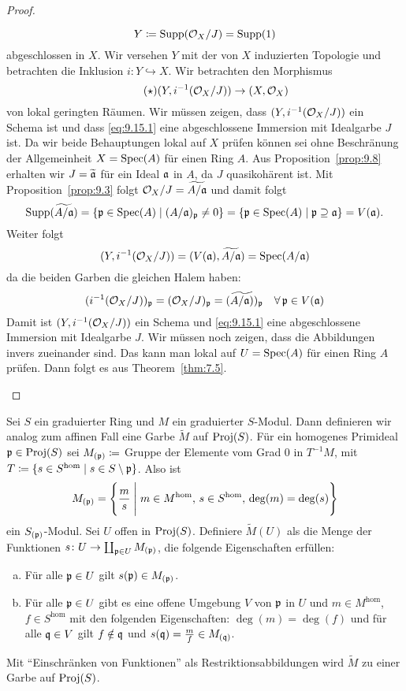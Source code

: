 \begin{prop}
\begin{proof}
\begin{enumerate}[i)]
 			\[
 				Y \coloneqq \operatorname{Supp}(\mathcal{O}_X/J) = \operatorname{Supp}(1)
 			\]
 			abgeschlossen in $X$. Wir versehen $Y$ mit der von $X$ induzierten Topologie und betrachten die Inklusion $i\colon Y \hookrightarrow X$. Wir betrachten den Morphismus
 			\[
 			\label{eq:9.15.1}\tag{$\star$}
 				(Y,i^{-1}(\mathcal{O}_X/J)) \to (X,\mathcal{O}_X)
 			\]
 			von lokal geringten Räumen. Wir müssen zeigen, dass $(Y,i^{-1}(\mathcal{O}_X/J))$ ein Schema ist und dass \eqref{eq:9.15.1} eine abgeschlossene Immersion mit Idealgarbe $J$ ist. Da wir beide Behauptungen lokal auf $X$ prüfen können sei ohne Beschränung der Allgemeinheit $X = \operatorname{Spec}(A)$ für einen Ring $A$. Aus Proposition~\ref{prop:9.8} erhalten wir $J = \widetilde{\mathfrak{a}}$ für ein Ideal $\mathfrak{a}$ in $A$, da $J$ quasikohärent ist. Mit Proposition~\ref{prop:9.3} folgt $\mathcal{O}_X/J = \widetilde{A/\mathfrak{a}}$ und damit folgt
 			\[
 				\operatorname{Supp}(\widetilde{A/\mathfrak{a}}) = \{\mathfrak{p} \in \operatorname{Spec}(A) \mid (A/\mathfrak{a})_{\mathfrak{p}} \neq 0\} = \{\mathfrak{p} \in \operatorname{Spec}(A) \mid \mathfrak{p} \supseteq \mathfrak{a}\} = V(\mathfrak{a}).
 			\]
 			Weiter folgt
 			\[
 				(Y,i^{-1}(\mathcal{O}_X/J)) = (V(\mathfrak{a}),\widetilde{A/\mathfrak{a}}) = \operatorname{Spec}(A/\mathfrak{a})
 			\]
 			da die beiden Garben die gleichen Halem haben:
 			\[
 				(i^{-1}(\mathcal{O}_X/J))_{\mathfrak{p}} = (\mathcal{O}_X/J)_{\mathfrak{p}} = (\widetilde{A/\mathfrak{a})})_{\mathfrak{p}}\quad \forall\, \mathfrak{p} \in V(\mathfrak{a})
 			\]
 			Damit ist $(Y,i^{-1}(\mathcal{O}_X/J))$ ein Schema und \eqref{eq:9.15.1} eine abgeschlossene Immersion mit Idealgarbe $J$. Wir müssen noch zeigen, dass die Abbildungen invers zueinander sind. Das kann man lokal auf $U=\operatorname{Spec}(A)$ für einen Ring $A$ prüfen. Dann folgt es aus Theorem~\ref{thm:7.5}.
 		\end{enumerate}
 	\end{proof}
\end{prop}

\begin{defn}
\label{defn:9.16}
	Sei $S$ ein graduierter Ring und $M$ ein graduierter $S$-Modul. Dann definieren wir analog zum affinen Fall eine Garbe $\widetilde{M}$ auf $\operatorname{Proj}(S)$. Für ein homogenes Primideal $\mathfrak{p} \in \operatorname{Proj}(S)$ sei $M_{(\mathfrak{p})}\coloneqq$ Gruppe der Elemente vom Grad $0$ in $T^{-1}M$, mit $T\coloneqq \{s \in S^\text{hom}\mid s \in S \setminus \mathfrak{p}\}$. Also ist
	\[
		M_{(\mathfrak{p})} = \Bigg\lbrace \frac{m}{s} \;\Bigg\vert\; m \in M^{\text{hom}},\, s \in S^{\text{hom}},\, \deg(m) = \deg(s) \Bigg\rbrace
	\]
	ein $S_{(\mathfrak{p})}$-Modul. Sei $U$ offen in $\operatorname{Proj}(S)$. Definiere $\widetilde{M}(U)$ als die Menge der Funktionen $s\colon U \to \coprod_{\mathfrak{p} \in U}M_{(\mathfrak{p})}$, die folgende Eigenschaften erfüllen:
	\begin{enumerate}[a)]
		\item Für alle $\mathfrak{p} \in U$ gilt $s(\mathfrak{p}) \in M_{(\mathfrak{p})}$.
		\item Für alle $\mathfrak{p} \in U$ gibt es eine offene Umgebung $V$ von $\mathfrak{p}$ in $U$ und $m \in M^{\text{hom}}$, $f\in S^{\text{hom}}$ mit den folgenden Eigenschaften: $\deg(m)=\deg(f)$ und für alle $\mathfrak{q} \in V$ gilt $f \notin \mathfrak{q}$ und $s(\mathfrak{q}) =  \frac{m}{f} \in M_{(\mathfrak{q})}$.
	\end{enumerate}
	Mit \enquote{Einschränken von Funktionen} als Restriktionsabbildungen wird $\widetilde{M}$ zu einer Garbe auf $\operatorname{Proj}(S)$.
\end{defn}

